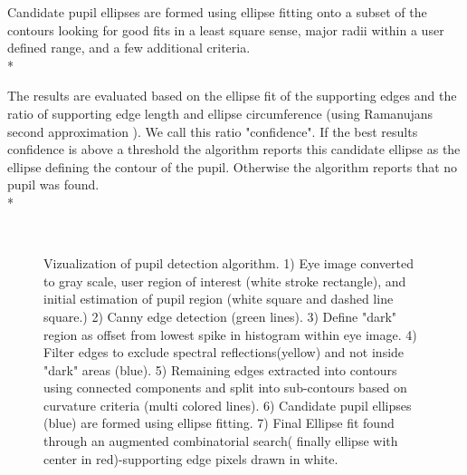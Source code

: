 \documentclass[12pt,fleqn]{book} %
\begin{document}
Candidate pupil ellipses are formed using ellipse fitting \cite{fitzgibbon96} onto a subset of the contours looking for good fits in a least square sense, major radii within a user defined range, and a few additional criteria. \\* 

The results are evaluated based on the ellipse fit of the supporting edges and the ratio of supporting edge length and ellipse circumference (using Ramanujans second approximation \cite{hardy1962collected} ). We call this ratio "confidence". If the best results confidence is above a threshold the algorithm reports this candidate ellipse as the ellipse defining the contour of the pupil. Otherwise the algorithm reports that no pupil was found.\\*

\begin{figure}[]
\begin{dBox}
\centering
  \mbox{
   }
   \caption{Vizualization of pupil detection algorithm. 1) Eye image converted to gray scale, user region of interest (white stroke rectangle), and initial estimation of pupil region (white square and dashed line square.) 2) Canny edge detection (green lines). 3) Define "dark" region as offset from lowest spike in histogram within eye image. 4) Filter edges to exclude spectral reflections(yellow) and not inside "dark" areas (blue). 5) Remaining edges extracted into contours using connected components and split into sub-contours based on curvature criteria (multi colored lines). 6) Candidate pupil ellipses (blue) are formed using ellipse fitting. 7) Final Ellipse fit found through an augmented combinatorial search( finally ellipse with center in red)-supporting edge pixels drawn in white.
 \label{fig:Pupil_Performance} }   
\end{dBox}   
\end{figure}
\end{document}
